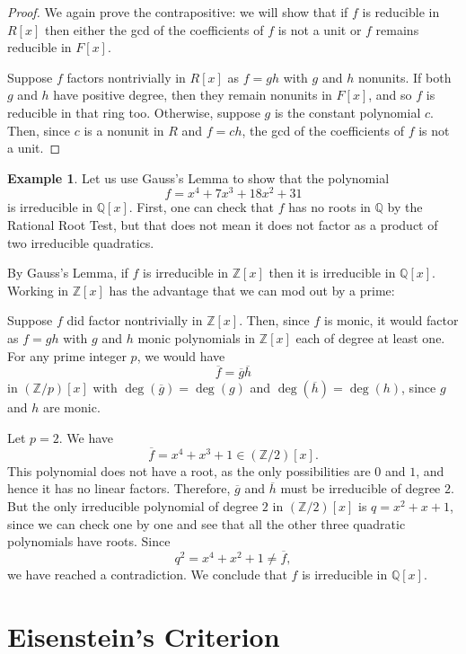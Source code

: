 \documentclass[12pt]{report}
\numberwithin{equation}{section}
\numberwithin{theorem}{chapter}
\theoremstyle{definition}
\newtheorem{example}[theorem]{Example}
\newtheorem*{basic properties}{Basic Properties}
\newtheorem*{Important Remark}{Important Remark}
\newcommand{\Z}{\mathbb{Z}}
\newcommand{\Q}{\mathbb{Q}}
\begin{document}
\begin{proof}
We again prove the contrapositive: we will show that if $f$ is reducible in $R[x]$ then either the gcd of the coefficients of $f$ is not a unit or $f$ remains  reducible in $F[x]$. 

Suppose $f$ factors nontrivially in $R[x]$ as $f = g h$ with $g$ and $h$ nonunits.
If both $g$ and $h$ have positive degree, then they remain nonunits in $F[x]$, and so $f$  is reducible in that ring too. Otherwise, suppose $g$ is the constant polynomial $c$.
Then, since $c$ is a nonunit in $R$ and $f = c h$, the gcd of the coefficients of $f$ is not a unit. 
\end{proof}




\begin{example} 
Let us use Gauss's Lemma to show that the polynomial 
$$f = x^4 + 7x^3 + 18x^2 + 31$$ 
is irreducible in $\Q[x]$. First, one can check that $f$ has no roots in $\Q$ by
  the Rational Root Test, but that does not mean it does not factor as a product of two irreducible quadratics.

By Gauss's Lemma, if $f$ is irreducible in $\Z[x]$ then it is irreducible in $\Q[x]$.  Working in $\Z[x]$ has the advantage that we can mod out by a prime:

Suppose $f$ did factor nontrivially in $\Z[x]$. Then, since $f$ is monic, it would factor as $f = g h$ with $g$ and $h$ monic polynomials in $\Z[x]$ each of degree at least one. For any prime integer $p$, we would have 
$$\overline{f} = \overline{g} \overline{h}$$ 
in $(\Z/p)[x]$ with $\deg(\overline{g}) = \deg(g)$ and $\deg(\overline{h}) = \deg(h)$, since $g$ and $h$ are monic. 

Let $p = 2$. We have 
$$\overline{f} = x^4 + x^3 + 1 \in (\Z/2)[x].$$ 
This polynomial does not have a root, as the only possibilities are $0$ and $1$, and hence it has no linear factors. Therefore, $\overline{g}$ and $\overline{h}$ must be irreducible of degree $2$. 
But the only irreducible polynomial of degree $2$ in $(\Z/2)[x]$ is $q = x^2+x + 1$, since we can check one by one and see that all the other three quadratic polynomials have roots.
Since 
$$q^2 = x^4 + x^2 + 1 \ne \overline{f},$$ 
we have reached a contradiction. We conclude that $f$ is irreducible in $\Q[x]$. 
\end{example}




\section{Eisenstein's Criterion}
\end{document}
